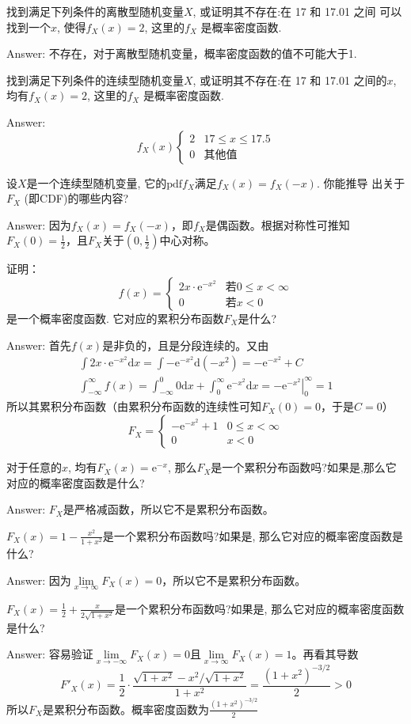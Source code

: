 \exer 找到满足下列条件的离散型随机变量$X$, 或证明其不存在:在 17 和 17.01 之间 可以找到一个$x$, 使得$f_X (x) = 2$, 这里的$f_X$ 是概率密度函数.\par
Answer: 不存在，对于离散型随机变量，概率密度函数的值不可能大于1.

\exer 找到满足下列条件的连续型随机变量$X$, 或证明其不存在:在 17 和 17.01 之间的$x$, 均有$f_X (x) = 2$, 这里的$f_X$ 是概率密度函数.\par
Answer: 
\[f_X(x)\begin{cases}
2 & 17\le x \le 17.5 \\
0 & \text{其他值}
\end{cases}\]

\exer 设$X$是一个连续型随机变量, 它的$\mathrm{pdf}f_X$满足$f_X (x) = f_X (−x)$. 你能推导 出关于$F_X$ (即CDF)的哪些内容?\par
Answer: 因为$f_X (x) = f_X (−x)$，即$f_X$是偶函数。根据对称性可推知$F_X(0)=\frac{1}{2}$，且$F_X$关于$(0,\frac{1}{2})$中心对称。

\exer 证明：
\[f(x)=\begin{cases}
2x\cdot \mathrm{e}^{-x^2} & \text{若}0\le x<\infty \\
0 & \text{若} x < 0
\end{cases}\]
是一个概率密度函数. 它对应的累积分布函数$F_X$是什么?\par
Answer: 首先$f(x)$是非负的，且是分段连续的。又由
\begin{gather*}
    \int 2x\cdot \mathrm{e}^{-x^2}\mathrm dx=\int -\mathrm{e}^{-x^2}\mathrm{d}(-x^2)=-\mathrm{e}^{-x^2} + C \\
    \int_{-\infty}^\infty f(x) = \int_{-\infty}^0 0\mathrm dx + \int_0^\infty \mathrm{e}^{-x^2}\mathrm dx = \left.-\mathrm{e}^{-x^2}\right|_0^\infty = 1
\end{gather*}
所以其累积分布函数（由累积分布函数的连续性可知$F_X(0)=0$，于是$C=0$）
\[F_X=\begin{cases}
    -\mathrm{e}^{-x^2} + 1 & 0\le x < \infty \\
    0 & x < 0
\end{cases}\]

\exer 对于任意的$x$, 均有$F_X (x) = \mathrm e^{-x}$, 那么$F_X$是一个累积分布函数吗?如果是,那么它对应的概率密度函数是什么?\par
Answer: $F_X$是严格减函数，所以它不是累积分布函数。

\exer $F_X (x) = 1 -\frac{x^2}{1+x^2}$是一个累积分布函数吗?如果是, 那么它对应的概率密度函数是什么?\par
Answer: 因为$\lim\limits_{x\to \infty}F_X(x)=0$，所以它不是累积分布函数。

\exer $F_X (x) = \frac{1}{2} +\frac{x}{2\sqrt{1+x^2}}$是一个累积分布函数吗?如果是, 那么它对应的概率密度函数是什么?\par
Answer: 容易验证$\lim\limits_{x\to -\infty}F_X(x)=0$且$\lim\limits_{x\to \infty}F_X(x)=1$。再看其导数
\[F'_X(x)=\frac{1}{2}\cdot \frac{\sqrt{1+x^2}-x^2/\sqrt{1+x^2}}{1+x^2}=\frac{(1+x^2)^{-3/2}}{2}>0\]
所以$F_X$是累积分布函数。概率密度函数为$\frac{(1+x^2)^{-3/2}}{2}$